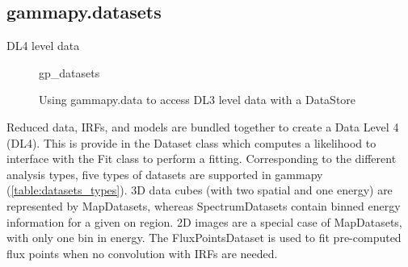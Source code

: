 \subsection{gammapy.datasets}
\label{ssec:gammapy-datasets}
DL4 level data

\begin{figure}

	{gp_datasets}
	\caption{Using gammapy.data to access DL3 level data with a DataStore}
	\label{fig*:minted:gp_datasets}
\end{figure}

Reduced data, IRFs, and models are bundled together to create a Data Level 4 (DL4). This is provide in the Dataset class which computes a likelihood to interface with the Fit class to perform a fitting. Corresponding to the different analysis types, five types of datasets are supported in gammapy (\ref{table:datasets_types}). 3D data cubes (with two spatial and one energy) are represented by MapDatasets, whereas SpectrumDatasets contain binned energy information for a given on region. 2D images are a special case of MapDatasets, with only one bin in energy. The FluxPointsDataset is used to fit pre-computed flux points when no convolution with IRFs are needed.

